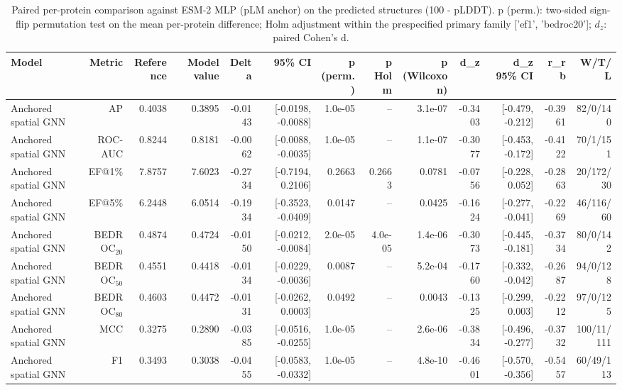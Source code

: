 \begin{table}[t]
\centering
\small
\caption{Paired per-protein comparison against ESM-2 MLP (pLM anchor) on the predicted structures (100 - pLDDT). p (perm.): two-sided sign-flip permutation test on the mean per-protein difference; Holm adjustment within the prespecified primary family ['ef1', 'bedroc20']; $d_z$: paired Cohen's d.}
\label{tab:table_paired_vs_base_plm}
\begin{tabular}{lrrrrrrrrrrrr}
\toprule
Model & Metric & Reference & Model value & Delta & 95\% CI & p (perm.) & p Holm & p (Wilcoxon) & d\_z & d\_z 95\% CI & r\_rb & W/T/L \\
\midrule
Anchored spatial GNN & AP & 0.4038 & 0.3895 & -0.0143 & [-0.0198, -0.0088] & 1.0e-05 & -- & 3.1e-07 & -0.3403 & [-0.479, -0.212] & -0.3961 & 82/0/140 \\
Anchored spatial GNN & ROC-AUC & 0.8244 & 0.8181 & -0.0062 & [-0.0088, -0.0035] & 1.0e-05 & -- & 1.1e-07 & -0.3077 & [-0.453, -0.172] & -0.4122 & 70/1/151 \\
Anchored spatial GNN & EF@1\% & 7.8757 & 7.6023 & -0.2734 & [-0.7194, 0.2106] & 0.2663 & 0.2663 & 0.0781 & -0.0756 & [-0.228, 0.052] & -0.2863 & 20/172/30 \\
Anchored spatial GNN & EF@5\% & 6.2448 & 6.0514 & -0.1934 & [-0.3523, -0.0409] & 0.0147 & -- & 0.0425 & -0.1624 & [-0.277, -0.041] & -0.2269 & 46/116/60 \\
Anchored spatial GNN & BEDROC$_{20}$ & 0.4874 & 0.4724 & -0.0150 & [-0.0212, -0.0084] & 2.0e-05 & 4.0e-05 & 1.4e-06 & -0.3073 & [-0.445, -0.181] & -0.3734 & 80/0/142 \\
Anchored spatial GNN & BEDROC$_{50}$ & 0.4551 & 0.4418 & -0.0134 & [-0.0229, -0.0036] & 0.0087 & -- & 5.2e-04 & -0.1760 & [-0.332, -0.042] & -0.2687 & 94/0/128 \\
Anchored spatial GNN & BEDROC$_{80}$ & 0.4603 & 0.4472 & -0.0131 & [-0.0262, 0.0003] & 0.0492 & -- & 0.0043 & -0.1325 & [-0.299, 0.003] & -0.2212 & 97/0/125 \\
Anchored spatial GNN & MCC & 0.3275 & 0.2890 & -0.0385 & [-0.0516, -0.0255] & 1.0e-05 & -- & 2.6e-06 & -0.3834 & [-0.496, -0.277] & -0.3732 & 100/11/111 \\
Anchored spatial GNN & F1 & 0.3493 & 0.3038 & -0.0455 & [-0.0583, -0.0332] & 1.0e-05 & -- & 4.8e-10 & -0.4601 & [-0.570, -0.356] & -0.5457 & 60/49/113 \\
\bottomrule
\end{tabular}
\end{table}
